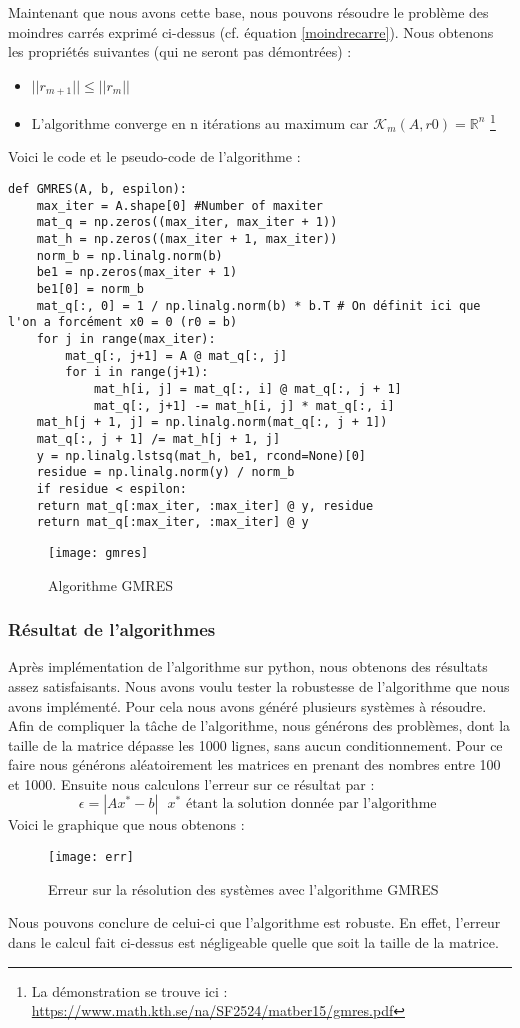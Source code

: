 Maintenant que nous avons cette base, nous pouvons résoudre le problème des moindres carrés exprimé ci-dessus (cf. équation \ref{moindrecarre}). Nous obtenons les propriétés suivantes (qui ne seront pas démontrées)  : 
\begin{itemize}
	\item $||r_{m+1}|| \leq ||r_m||$
	\item L'algorithme converge en n itérations au maximum car $\mathcal{K}_m(A, r0) = \mathbb{R}^n$ \footnote{La démonstration se trouve ici : \url{https://www.math.kth.se/na/SF2524/matber15/gmres.pdf}}
\end{itemize}
Voici le code et le pseudo-code de l'algorithme : 
\begin{verbatim}
def GMRES(A, b, espilon):
	max_iter = A.shape[0] #Number of maxiter
	mat_q = np.zeros((max_iter, max_iter + 1))
	mat_h = np.zeros((max_iter + 1, max_iter))
	norm_b = np.linalg.norm(b)
	be1 = np.zeros(max_iter + 1)
	be1[0] = norm_b
	mat_q[:, 0] = 1 / np.linalg.norm(b) * b.T # On définit ici que l'on a forcément x0 = 0 (r0 = b)
	for j in range(max_iter):
		mat_q[:, j+1] = A @ mat_q[:, j]
		for i in range(j+1):
			mat_h[i, j] = mat_q[:, i] @ mat_q[:, j + 1]
			mat_q[:, j+1] -= mat_h[i, j] * mat_q[:, i]
	mat_h[j + 1, j] = np.linalg.norm(mat_q[:, j + 1])
	mat_q[:, j + 1] /= mat_h[j + 1, j]
	y = np.linalg.lstsq(mat_h, be1, rcond=None)[0]
	residue = np.linalg.norm(y) / norm_b
	if residue < espilon:
	return mat_q[:max_iter, :max_iter] @ y, residue
	return mat_q[:max_iter, :max_iter] @ y
\end{verbatim}
\begin{figure}
	\centering
	\texttt{[image: gmres]}
	\caption{Algorithme GMRES}
	\label{fig:gmres}
\end{figure}
\subsubsection{Résultat de l'algorithmes}

Après implémentation de l'algorithme sur python, nous obtenons des résultats assez satisfaisants. Nous avons voulu tester la robustesse de l'algorithme que nous avons implémenté. Pour cela nous avons généré plusieurs systèmes à résoudre. Afin de compliquer la tâche de l'algorithme, nous générons des problèmes, dont la taille de la matrice dépasse les 1000 lignes, sans aucun conditionnement. Pour ce faire nous générons aléatoirement les matrices en prenant des nombres entre 100 et 1000. Ensuite nous calculons l'erreur sur ce résultat par : 
\begin{equation}
\epsilon = |Ax^* - b| \text{ $x^*$ étant la solution donnée par l'algorithme }
\end{equation} 
Voici le graphique que nous obtenons : 
\begin{figure}[H]
	\centering
	\texttt{[image: err]}
	\caption{Erreur sur la résolution des systèmes avec l'algorithme GMRES}
	\label{fig:err}
\end{figure}

Nous pouvons conclure de celui-ci que l'algorithme est robuste. En effet, l'erreur dans le calcul fait ci-dessus est négligeable quelle que soit la taille de la matrice.